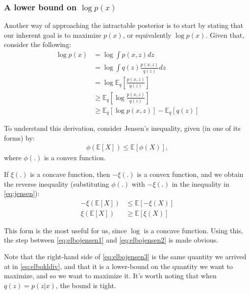 \subsubsection{A lower bound on $\log p(x)$}
\label{subsubsection:elbo}

Another way of approaching the intractable posterior is to start by stating
that our inherent goal is to maximize $p(x)$, or equivalently $\log p(x)$. Given
that, consider the following:
\begin{align}
    \log p(x) &= \log \int p(x, z) dz\\
    &= \log \int q(z) \frac{p(x, z)}{q(z)} dz \\
    &= \log \mathbb{E}_q[\frac{p(x, z)}{q(z)}] \label{eq:elbojensen1} \\
    &\geq \mathbb{E}_q[\log \frac{p(x, z)}{q(z)}] \label{eq:elbojensen2} \\
    &\geq \mathbb{E}_q[\log p(x, z)] - \mathbb{E}_q[q(z)] \label{eq:elbojensen3}
\end{align}

To understand this derivation, consider Jensen's inequality, given (in one of
its forms) by:
\begin{align}
    \phi(\mathbb{E}[X]) \leq \mathbb{E}[\phi(X)], \label{eq:jensen}
\end{align} where $\phi(.)$ is a convex function.

If $\xi(.)$ is a concave function, then $- \xi(.)$ is a convex function, and we
obtain the reverse inequality (substituting $\phi(.)$ with $-\xi(.)$ in the
inequality in \ref{eq:jensen}):
\begin{align}
    -\xi(\mathbb{E}[X]) &\leq \mathbb{E}[-\xi(X)] \\
    \xi(\mathbb{E}[X]) &\geq \mathbb{E}[\xi(X)]
\end{align}

This form is the most useful for us, since $\log$ is a concave function. Using
this, the step between \ref{eq:elbojensen1} and \ref{eq:elbojensen2} is made
obvious.

Note that the right-hand side of \ref{eq:elbojensen3} is the same quantity
we arrived at in \ref{eq:elbokldiv}, and that it is a lower-bound on the
quantity we want to maximize, and so we want to maximize it. It's worth noting
that when $q(z) = p(z|x)$, the bound is tight.
